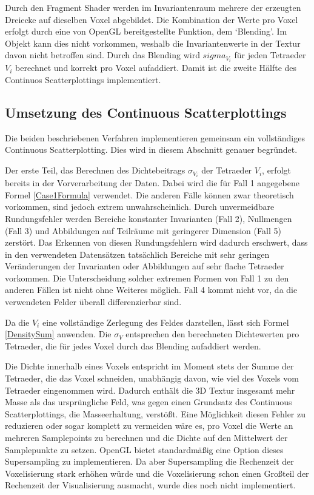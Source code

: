 \documentclass[a4paper,fontsize=12pt,toc=bib,halfparskip]{scrartcl}
\begin{document}
Durch den Fragment Shader werden im Invariantenraum mehrere der erzeugten Dreiecke auf dieselben Voxel abgebildet. Die Kombination der Werte pro Voxel erfolgt durch eine von OpenGL bereitgestellte Funktion, dem `Blending'. Im Objekt kann dies nicht vorkommen, weshalb die Invariantenwerte in der Textur davon nicht betroffen sind. Durch das Blending wird $sigma_{V_i}$ f\"ur jeden Tetraeder $V_i$ berechnet und korrekt pro Voxel aufaddiert. Damit ist die zweite H\"alfte des Continuos Scatterplottings implementiert.

\subsection{Umsetzung des Continuous Scatterplottings}
\label{CSPImplementation}
Die beiden beschriebenen Verfahren implementieren gemeinsam ein vollst\"andiges Continuous Scatterplotting. Dies wird in diesem Abschnitt genauer begr\"undet.

Der erste Teil, das Berechnen des Dichtebeitrags $\sigma_{V_i}$ der Tetraeder $V_i$, erfolgt bereits in der Vorverarbeitung der Daten. Dabei wird die f\"ur Fall 1 angegebene Formel \ref{Case1Formula} verwendet. Die anderen F\"alle k\"onnen zwar theoretisch vorkommen, sind jedoch extrem unwahrscheinlich. Durch unvermeidbare Rundungsfehler werden Bereiche konstanter Invarianten (Fall 2), Nullmengen (Fall 3) und Abbildungen auf Teilr\"aume mit geringerer Dimension (Fall 5) zerst\"ort. Das Erkennen von diesen Rundungsfehlern wird dadurch erschwert, dass in den verwendeten Datens\"atzen tats\"achlich Bereiche mit sehr geringen Ver\"anderungen der Invarianten oder Abbildungen auf sehr flache Tetraeder vorkommen. Die Unterscheidung solcher extremen Formen von Fall 1 zu den anderen F\"allen ist nicht ohne Weiteres m\"oglich. Fall 4 kommt nicht vor, da die verwendeten Felder \"uberall differenzierbar sind.

Da die $V_i$ eine vollst\"andige Zerlegung des Feldes darstellen, l\"asst sich Formel \ref{DensitySum} anwenden. Die $\sigma_V$ entsprechen den berechneten Dichtewerten pro Tetraeder, die f\"ur jedes Voxel durch das Blending aufaddiert werden.

Die Dichte innerhalb eines Voxels entspricht im Moment stets der Summe der Tetraeder, die das Voxel schneiden, unabh\"angig davon, wie viel des Voxels vom Tetraeder eingenommen wird. Dadurch enth\"alt die 3D Textur insgesamt mehr Masse als das urspr\"ungliche Feld, was gegen einen Grundsatz des Continuous Scatterplottings, die Masseerhaltung, verst\"o{\ss}t. Eine M\"oglichkeit diesen Fehler zu reduzieren oder sogar komplett zu vermeiden w\"are es, pro Voxel die Werte an mehreren Samplepoints zu berechnen und die Dichte auf den Mittelwert der Samplepunkte zu setzen. OpenGL bietet standardm\"a{\ss}ig eine Option dieses Supersampling zu implementieren. Da aber Supersampling die Rechenzeit der Voxelisierung stark erh\"ohen w\"urde und die Voxelisierung schon einen Gro{\ss}teil der Rechenzeit der Visualisierung ausmacht, wurde dies noch nicht implementiert.
\end{document}
